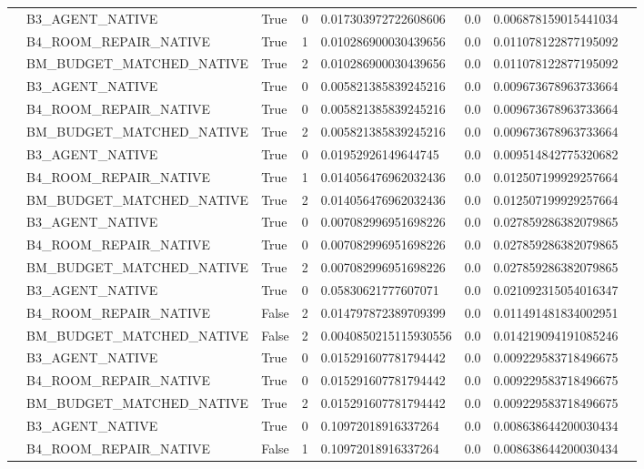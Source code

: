 \begin{tabular}{llllllll}
 & B3\_AGENT\_NATIVE & True & 0 & 0.017303972722608606 & 0.0 & 0.006878159015441034 &  \\
 & B4\_ROOM\_REPAIR\_NATIVE & True & 1 & 0.010286900030439656 & 0.0 & 0.011078122877195092 &  \\
 & BM\_BUDGET\_MATCHED\_NATIVE & True & 2 & 0.010286900030439656 & 0.0 & 0.011078122877195092 &  \\
 & B3\_AGENT\_NATIVE & True & 0 & 0.005821385839245216 & 0.0 & 0.009673678963733664 &  \\
 & B4\_ROOM\_REPAIR\_NATIVE & True & 0 & 0.005821385839245216 & 0.0 & 0.009673678963733664 &  \\
 & BM\_BUDGET\_MATCHED\_NATIVE & True & 2 & 0.005821385839245216 & 0.0 & 0.009673678963733664 &  \\
 & B3\_AGENT\_NATIVE & True & 0 & 0.01952926149644745 & 0.0 & 0.009514842775320682 &  \\
 & B4\_ROOM\_REPAIR\_NATIVE & True & 1 & 0.014056476962032436 & 0.0 & 0.012507199929257664 &  \\
 & BM\_BUDGET\_MATCHED\_NATIVE & True & 2 & 0.014056476962032436 & 0.0 & 0.012507199929257664 &  \\
 & B3\_AGENT\_NATIVE & True & 0 & 0.007082996951698226 & 0.0 & 0.027859286382079865 &  \\
 & B4\_ROOM\_REPAIR\_NATIVE & True & 0 & 0.007082996951698226 & 0.0 & 0.027859286382079865 &  \\
 & BM\_BUDGET\_MATCHED\_NATIVE & True & 2 & 0.007082996951698226 & 0.0 & 0.027859286382079865 &  \\
 & B3\_AGENT\_NATIVE & True & 0 & 0.05830621777607071 & 0.0 & 0.021092315054016347 &  \\
 & B4\_ROOM\_REPAIR\_NATIVE & False & 2 & 0.014797872389709399 & 0.0 & 0.011491481834002951 &  \\
 & BM\_BUDGET\_MATCHED\_NATIVE & False & 2 & 0.0040850215115930556 & 0.0 & 0.014219094191085246 &  \\
 & B3\_AGENT\_NATIVE & True & 0 & 0.015291607781794442 & 0.0 & 0.009229583718496675 &  \\
 & B4\_ROOM\_REPAIR\_NATIVE & True & 0 & 0.015291607781794442 & 0.0 & 0.009229583718496675 &  \\
 & BM\_BUDGET\_MATCHED\_NATIVE & True & 2 & 0.015291607781794442 & 0.0 & 0.009229583718496675 &  \\
 & B3\_AGENT\_NATIVE & True & 0 & 0.10972018916337264 & 0.0 & 0.008638644200030434 &  \\
 & B4\_ROOM\_REPAIR\_NATIVE & False & 1 & 0.10972018916337264 & 0.0 & 0.008638644200030434 &  \\

\end{tabular}
